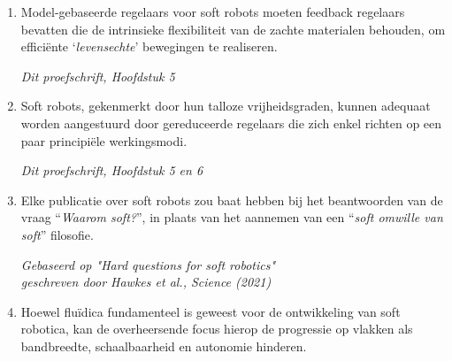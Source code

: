 \documentclass[a5paper]{article}
\begin{document}
\begin{enumerate}
\item \sloppy Model-gebaseerde regelaars voor soft robots moeten feedback \mbox{regelaars} bevatten die de intrinsieke flexibiliteit van de zachte materialen \mbox{behouden}, om efficiënte `\textit{levensechte}' bewegingen te realiseren.
\begin{flushright}
\vspace{-2mm}
\textit{Dit proefschrift, Hoofdstuk 5}
\vspace{-1mm}
\end{flushright}

\item Soft robots, gekenmerkt door hun talloze vrijheidsgraden, kunnen \mbox{adequaat} worden aangestuurd door gereduceerde regelaars die zich enkel richten op een paar principiële werkingsmodi.
\begin{flushright}
\vspace{-2mm}
\textit{Dit proefschrift, Hoofdstuk 5 en 6}
\vspace{-1mm}
\end{flushright}  

\item Elke publicatie over soft robots zou baat hebben bij het beantwoorden van de vraag ``\textit{Waarom soft?}'', in plaats van het aannemen van een ``\textit{soft omwille van soft}'' filosofie.
%  
\begin{flushright}
\vspace{-2mm}
\textit{Gebaseerd op "Hard questions for soft robotics" \\ geschreven door Hawkes et al., Science (2021)}
\vspace{-1mm}
\end{flushright}  

\item Hoewel fluïdica fundamenteel is geweest voor de ontwikkeling van soft robotica, kan de overheersende focus hierop de progressie op vlakken als bandbreedte, schaalbaarheid en autonomie hinderen.


\end{enumerate}
\end{document}

